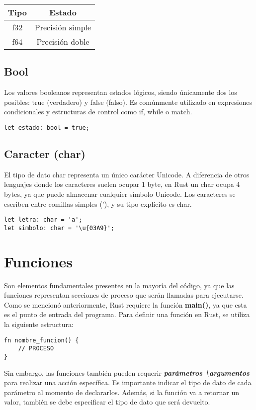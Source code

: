 \documentclass[12pt]{article}
\begin{document}
	\begin{table}[H]
		\centering
		\begin{tabular}{|c|c|}
			\hline
			Tipo & Estado \\
			\hline
			f32 & Precisión simple \\
			\hline
			f64 & Precisión doble \\
			\hline
			\end{tabular}
	\end{table}
	\subsection{Bool}
	Los valores booleanos representan estados lógicos, siendo únicamente dos los posibles: true (verdadero) y false (falso). Es comúnmente utilizado en expresiones condicionales y estructuras de control como if, while o match.
\begin{lstlisting}[style=ruststyle]
let estado: bool = true;
\end{lstlisting}
	\subsection{Caracter (char)}
El tipo de dato char representa un único carácter Unicode. A diferencia de otros lenguajes donde los caracteres suelen ocupar 1 byte, en Rust un char ocupa 4 bytes, ya que puede almacenar cualquier símbolo Unicode. Los caracteres se escriben entre comillas simples ('), y su tipo explícito es char.
\begin{lstlisting}[style=ruststyle]
let letra: char = 'a';
let simbolo: char = '\u{03A9}';
\end{lstlisting}

	\section{Funciones}
	Son elementos fundamentales presentes en la mayoría del código, ya que las funciones representan secciones de proceso que serán llamadas para ejecutarse. Como se mencionó anteriormente, Rust requiere la función \textbf{main()}, ya que esta es el punto de entrada del programa. Para definir una función en Rust, se utiliza la siguiente estructura:

\begin{lstlisting}[style=ruststyle]
fn nombre_funcion() {
	// PROCESO
}
\end{lstlisting}

	Sin embargo, las funciones también pueden requerir \textbf{\textit{parámetros \textbackslash argumentos}} para realizar una acción específica.
	Es importante indicar el tipo de dato de cada parámetro al momento de declararlos. Además, si la función va a retornar un valor, también se debe especificar el tipo de dato que será devuelto.
\end{document}
